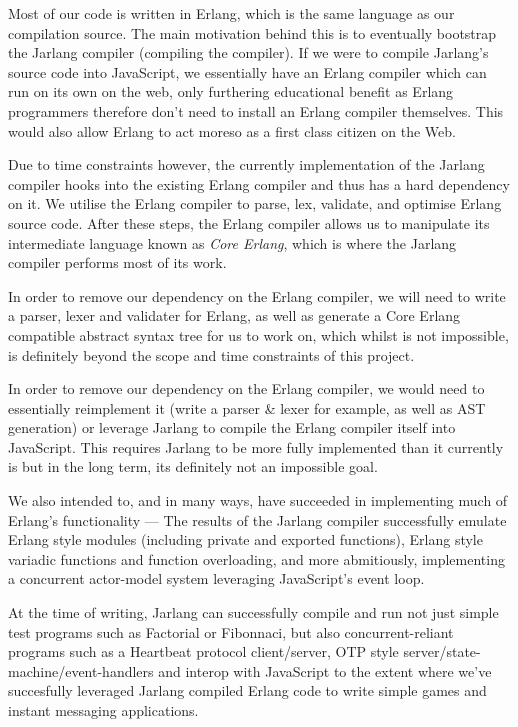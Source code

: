 \documentclass[twoside,12pt,titlepage,a4paper]{article}
\begin{document}
Most of our code is written in Erlang, which is the same language as our compilation source. The main motivation behind this is to eventually bootstrap the Jarlang compiler (compiling the compiler). If we were to compile Jarlang's source code into JavaScript, we essentially have an Erlang compiler which can run on its own on the web, only furthering educational benefit as Erlang programmers therefore don't need to install an Erlang compiler themselves. This would also allow Erlang to act moreso as a first class citizen on the Web.

Due to time constraints however, the currently implementation of the Jarlang compiler hooks into the existing Erlang compiler and thus has a hard dependency on it. We utilise the Erlang compiler to parse, lex, validate, and optimise Erlang source code. After these steps, the Erlang compiler allows us to manipulate its intermediate language known as \textit{Core Erlang}, which is where the Jarlang compiler performs most of its work.

In order to remove our dependency on the Erlang compiler, we will need to write a parser, lexer and validater for Erlang, as well as generate a Core Erlang compatible abstract syntax tree for us to work on, which whilst is not impossible, is definitely beyond the scope and time constraints of this project.

In order to remove our dependency on the Erlang compiler, we would need to essentially reimplement it (write a parser \& lexer for example, as well as AST generation) or leverage Jarlang to compile the Erlang compiler itself into JavaScript. This requires Jarlang to be more fully implemented than it currently is but in the long term, its definitely not an impossible goal.

We also intended to, and in many ways, have succeeded in implementing much of Erlang's functionality --- The results of the Jarlang compiler successfully emulate Erlang style modules (including private and exported functions), Erlang style variadic functions and function overloading, and more abmitiously, implementing a concurrent actor-model system leveraging JavaScript's event loop.

At the time of writing, Jarlang can successfully compile and run not just simple test programs such as Factorial or Fibonnaci, but also concurrent-reliant programs such as a Heartbeat protocol client/server, OTP style server/state-machine/event-handlers and interop with JavaScript to the extent where we've succesfully leveraged Jarlang compiled Erlang code to write simple games and instant messaging applications.
\end{document}
